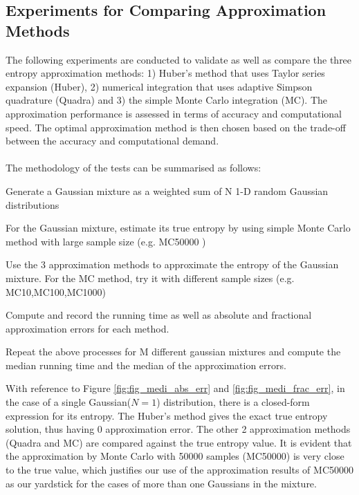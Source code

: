 \documentclass[a4paper,11pt]{report}
\begin{document}
\subsection{Experiments for Comparing Approximation Methods}
The following experiments are conducted to validate as well as compare the three entropy approximation  methods: 1) Huber's method that uses Taylor series expansion (Huber), 2) numerical integration that uses adaptive Simpson quadrature (Quadra) and 3) the simple Monte Carlo integration (MC). The approximation performance is assessed in terms of accuracy and computational speed. The optimal approximation method is then chosen based on the trade-off between the accuracy and computational demand. 
\\\\
The methodology of the tests can be summarised as follows: 
\begin{enumerate} [label={[\arabic*]}]
          \item Generate a Gaussian mixture as a weighted sum of N 1-D random Gaussian distributions
          \item For the Gaussian mixture, estimate its true entropy by using simple Monte Carlo method with large sample size (e.g. MC50000 )
          \item Use the 3 approximation methods to approximate the entropy of the Gaussian mixture. For the MC method, try it with different sample sizes  (e.g. MC10,MC100,MC1000)
          \item Compute and record the running time as well as absolute and fractional approximation errors for each method.
          \item Repeat the above processes for M different gaussian mixtures and compute the median running time and the median of the approximation errors. 
\end{enumerate} 
\noindent
With reference to Figure \ref{fig:fig_medi_abs_err} and \ref{fig:fig_medi_frac_err}, in the case of a single Gaussian($N=1$) distribution, there is a closed-form expression for its entropy. The Huber's method gives the exact true entropy solution, thus having 0 approximation error. The other 2 approximation methods (Quadra and MC) are compared against the true entropy value. It is evident that the approximation by Monte Carlo with 50000 samples (MC50000) is very close to the true value, which justifies our use of the approximation results of MC50000 as our yardstick for the cases of more than one Gaussians in the mixture. 
\\
\end{document}

